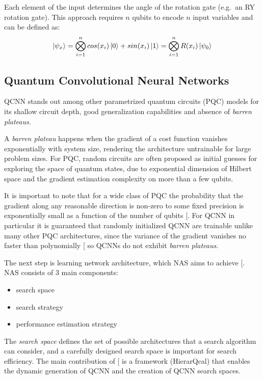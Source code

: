 \documentclass[
  13pt,
  a4paper,
  DIV=11,
  numbers=noendperiod]{scrreprt}
\providecommand{\tightlist}{%
  \setlength{\itemsep}{0pt}\setlength{\parskip}{0pt}}\usepackage{longtable,booktabs,array}
\begin{document}
Each element of the input determines the angle of the rotation gate
(e.g.~an RY rotation gate). This approach requires \(n\) qubits to
encode \(n\) input variables and can be defined as: \[
\ket{\psi_x} = \bigotimes_{i=1}^n cos(x_i) \ket{0} + sin(x_i)\ket{1} = \bigotimes_{i=1}^n R(x_i)\ket{\psi_0}
\]

\subsection{Quantum Convolutional Neural
Networks}\label{quantum-convolutional-neural-networks}

QCNN stands out among other parametrized quantum circuits (PQC) models
for its shallow circuit depth, good generalization capabilities and
absence of \emph{barren plateaus}.

A \emph{barren plateau} happens when the gradient of a cost function
vanishes exponentially with system size, rendering the architecture
untrainable for large problem sizes. For PQC, random circuits are often
proposed as initial guesses for exploring the space of quantum states,
due to exponential dimension of Hilbert space and the gradient
estimation complexity on more than a few qubits.

It is important to note that for a wide class of PQC the probability
that the gradient along any reasonable direction is non-zero to some
fixed precision is exponentially small as a function of the number of
qubits {[}\citeproc{ref-McClean2018Nov}{3}{]}. For QCNN in particular it
is guaranteed that randomly initialized QCNN are trainable unlike many
other PQC architectures, since the variance of the gradient vanishes no
faster than polynomially {[}\citeproc{ref-Pesah2021Oct}{4}{]} so QCNNs
do not exhibit \emph{barren plateaus}.

The next step is learning network architecture, which NAS aims to
achieve {[}\citeproc{ref-elsken2019neural}{5}{]}. NAS consists of 3 main
components:

\begin{itemize}
\tightlist
\item
  search space
\item
  search strategy
\item
  performance estimation strategy
\end{itemize}

The \emph{search space} defines the set of possible architectures that a
search algorithm can consider, and a carefully designed search space is
important for search efficiency. The main contribution of
{[}\citeproc{ref-lourens2023hierarchical}{1}{]} is a framework
(HierarQcal) that enables the dynamic generation of QCNN and the
creation of QCNN search spaces.
\end{document}
